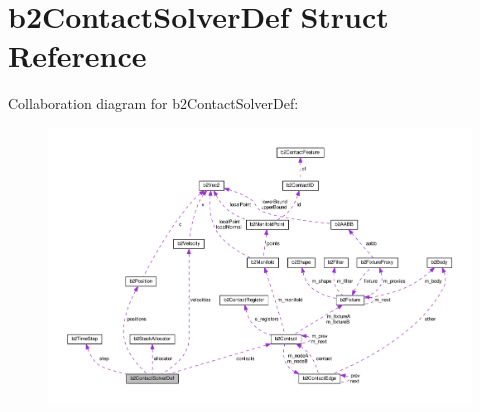 \hypertarget{structb2ContactSolverDef}{}\section{b2\+Contact\+Solver\+Def Struct Reference}
\label{structb2ContactSolverDef}


Collaboration diagram for b2\+Contact\+Solver\+Def\+:
\nopagebreak
\begin{figure}[H]
\begin{center}
\leavevmode
\includegraphics[width=350pt]{structb2ContactSolverDef__coll__graph}
\end{center}
\end{figure}
